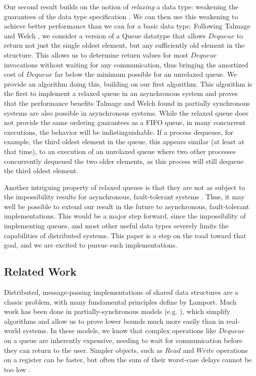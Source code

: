 \documentclass[a4paper,anonymous,USenglish]{lipics-v2021}
\theoremstyle{definition}
\begin{document}
Our second result builds on the notion of \emph{relaxing} a data type: weakening the guarantees of the data type specification \cite{HenzingerKirschPayerSezginSokolova13}.  We can then use this weakening to achieve better performance than we can for a basic data type.  Following Talmage and Welch \cite{TalmageWelch14}, we consider a version of a Queue datatype that allows $Dequeue$ to return not just the single oldest element, but any sufficiently old element in the structure.  This allows us to determine return values for most $Dequeue$ invocations without waiting for any communication, thus bringing the amortized cost of $Dequeue$ far below the minimum possible for an unrelaxed queue.  We provide an algorithm doing this, building on our first algorithm.  This algorithm is the first to implement a relaxed queue in an asynchronous system and proves that the performance benefits Talmage and Welch \cite{TalmageWelch14} found in partially synchronous systems are also possible in asynchronous systems.  While the relaxed queue does not provide the same ordering guarantees as a FIFO queue, in many concurrent executions, the behavior will be indistinguishable.  If a process dequeues, for example, the third oldest element in the queue, this appears similar (at least at that time), to an execution of an unrelaxed queue where two other processes concurrently dequeued the two older elements, as this process will still dequeue the third oldest element.

Another intriguing property of relaxed queues is that they are not as subject to the impossibility results for asynchronous, fault-tolerant systems \cite{ShavitTaubenfeld16,TalmageWelch19}.  Thus, it may well be possible to extend our result in the future to asynchronous, fault-tolerant implementations.  This would be a major step forward, since the impossibility of implementing queues, and most other useful data types severely limits the capabilities of distributed systems.  This paper is a step on the road toward that goal, and we are excited to pursue such implementations.

\subsection{Related Work}

Distributed, message-passing implementations of shared data structures are a classic problem, with many fundamental principles define by Lamport.  Much work has been done in partially-synchronous models (e.g. \cite{Kosa99, WangTalmageLeeWelch18, ChandraHadzilacosToueg16}), which simplify algorithms and allow us to prove lower bounds much more easily than in real-world systems.  In these models, we know that complex operations like $Dequeue$ on a queue are inherently expensive, needing to wait for communication before they can return to the user.  Simpler objects, such as $Read$ and $Write$ operations on a register can be faster, but often the sum of their worst-case delays cannot be too low \cite{MavronicolasRoth99}.
\end{document}
